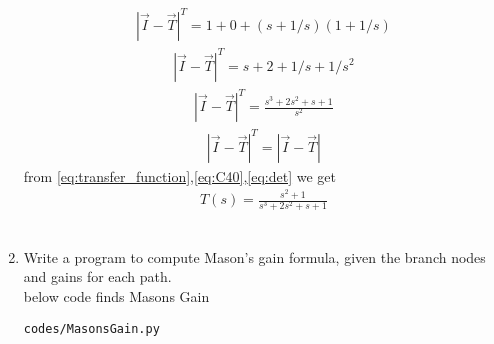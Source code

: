 \begin{enumerate}[label=\thesection.\arabic*.,ref=\thesection.\theenumi]
\begin{align}
\end{align}
\begin{align}
|\vec{I}-\vec{T}|^T=1+0+(s+1/s)(1+1/s)
\end{align}
\begin{align}
|\vec{I}-\vec{T}|^T=s+2+ 1/s +1/s^2
\end{align}
\begin{align}
 |\vec{I}-\vec{T}|^T=\frac{s^3+2s^2+s+1}{s^2}
 \label{eq:det}
\end{align}
\begin{align}
 |\vec{I}-\vec{T}|^T= |\vec{I}-\vec{T}|
\end{align}
from \eqref{eq:transfer_function},\eqref{eq:C40},\eqref{eq:det} we get
\begin{align}
    T(s)=\frac{s^2+1}{s^3+2s^2+s+1}
\end{align}
\\
\item Write a program to compute Mason's gain formula, given the branch nodes and gains for each path.
\\
\solution below code finds Masons Gain 
\begin{lstlisting}
codes/MasonsGain.py
\end{lstlisting}
\end{enumerate}
